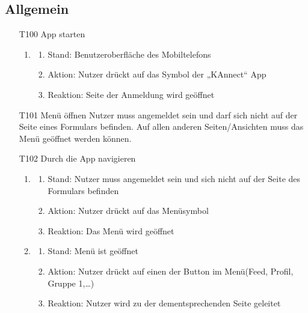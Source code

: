 \documentclass[parskip=full]{scrartcl}
\begin{document}
		\subsection{Allgemein}
		
		\begin{itemize}
			\item[T100] \gls{App} starten
			\begin{enumerate}
				\item
				\begin{enumerate}[nosep]	
					\item Stand: Benutzeroberfläche des Mobiltelefons
					\item Aktion: Nutzer drückt auf das  Symbol der „KAnnect“ \gls{App}
					\item Reaktion: Seite der Anmeldung wird geöffnet
				\end{enumerate} 
			\end{enumerate}
			
			
			
			\item[T101] Menü öffnen
			Nutzer muss angemeldet sein und darf sich nicht auf der Seite eines Formulars befinden. Auf allen anderen Seiten/Ansichten muss das Menü geöffnet werden können.

		
		
		
		\item[T102] Durch die \gls{App} navigieren
		\begin{enumerate}
			\item
			\begin{enumerate}[nosep]	
				\item Stand: Nutzer muss angemeldet sein und sich nicht auf der Seite des Formulars befinden
				\item Aktion: Nutzer  drückt auf das Menüsymbol
				\item Reaktion:  Das Menü wird geöffnet
			\end{enumerate} 
			\item
			\begin{enumerate}[nosep]	
				\item Stand: Menü ist geöffnet
				\item Aktion: Nutzer drückt auf einen der \gls{Button} im Menü(\gls{Feed}, Profil, Gruppe 1,…)
				\item Reaktion: Nutzer wird zu der dementsprechenden Seite geleitet
			\end{enumerate}
		\end{enumerate}
		

\end{itemize}
\end{document}
